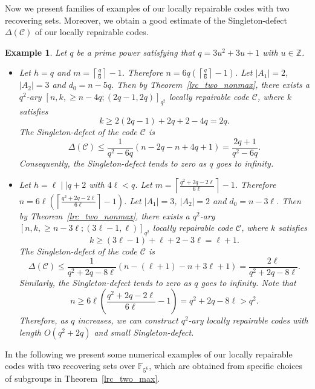 \documentclass[journal,12pt,onecolumn]{IEEEtran}
\newtheorem{example}{Example}
\begin{document}
Now we present families of examples of our locally repairable codes with two recovering sets. Moreover, we obtain a good estimate of the Singleton-defect \( \Delta(\mathcal{C}) \) of our locally repairable codes. 

\begin{example}\label{lrc_two_ex_1}
    Let \( q \) be a prime power satisfying that \(q = 3u^2 + 3u + 1\) with \(u\in\mathbb{Z}\). 
    \begin{itemize}
        \item[(i)] Let \(h = q\) and \(m = \left\lceil \frac{q}{6} \right\rceil - 1\). Therefore \(n = 6q\left(\left\lceil \frac{q}{6} \right\rceil - 1\right)\). Let \(|A_1| = 2\), \(|A_2| = 3\) and \(d_0 = n - 5q\). Then by Theorem~\ref{lrc_two_nonmax}, there exists a \( q^2 \)-ary \([n, k, \ge n - 4q;(2q-1,2q)]_{q^2}\) locally repairable code \(\mathcal{C}\), where \(k\) satisfies
        \[
            k \geq 2(2q-1) + 2q  + 2 - 4q = 2q. 
        \]
        The Singleton-defect of the code \(\mathcal{C}\) is
        \[
            \Delta(\mathcal{C}) \le \frac{1}{q^2-6q}(n - 2q - n + 4q + 1) = \frac{2q + 1}{q^2-6q}. 
        \]
        Consequently, the Singleton-defect tends to zero as \(q\) goes to infinity.
        \item[(ii)] Let \(h = \ell \mid\mid q + 2\) with \(4\ell<q\). Let \(m = \left\lceil \frac{q^2 +2q - 2\ell}{6\ell} \right\rceil - 1\). Therefore \(n = 6\ell\left(\left\lceil \frac{q^2 +2q - 2\ell}{6\ell} \right\rceil - 1\right)\). Let \(|A_1| = 3\), \(|A_2| = 2\) and \(d_0 = n - 3\ell\). Then by Theorem~\ref{lrc_two_nonmax}, there exists a \( q^2 \)-ary \([n, k, \ge n - 3\ell;(3\ell-1,\ell)]_{q^2}\) locally repairable code \(\mathcal{C}\), where \(k\) satisfies
        \[
            k \geq (3\ell-1) + \ell  + 2 - 3\ell = \ell + 1. 
        \]
        The Singleton-defect of the code \(\mathcal{C}\) is
        \[
            \Delta(\mathcal{C}) \le \frac{1}{q^2 + 2q - 8\ell}(n - (\ell+1) - n + 3\ell + 1) = \frac{2\ell}{q^2 + 2q - 8\ell}. 
        \]
        Similarly, the Singleton-defect tends to zero as \(q\) goes to infinity. Note that
        \[
            n\ge 6\ell\left( \frac{q^2 +2q - 2\ell}{6\ell}  - 1\right) = q^2 + 2q - 8\ell > q^2. 
        \]
        Therefore, as \( q \) increases, we can construct \( q^2 \)-ary locally repairable codes with length \(O(q^2 + 2q)\) and small Singleton-defect.
    \end{itemize}
\end{example}


In the following we present some numerical examples of our locally repairable codes with two recovering sets over \(\mathbb{F}_{5^{6}}\), which are obtained from specific choices of subgroups in Theorem~\ref{lrc_two_max}.
\end{document}
